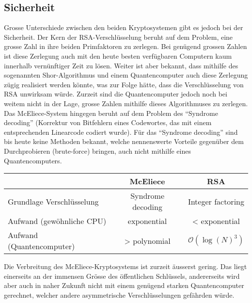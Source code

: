 \subsection{Sicherheit}
Grosse Unterschiede zwischen den beiden Kryptosystemen gibt es jedoch bei der Sicherheit.
Der Kern der RSA-Verschlüsselung beruht auf dem Problem, eine grosse Zahl in ihre beiden Primfaktoren zu zerlegen.
Bei genügend grossen Zahlen ist diese Zerlegung auch mit den heute besten verfügbaren Computern kaum innerhalb vernünftiger Zeit zu lösen.
Weiter ist aber bekannt,
dass mithilfe des sogenannten Shor-Algorithmus \cite{mceliece:shor} und einem Quantencomputer auch diese Zerlegung zügig realisiert werden könnte,
was zur Folge hätte, dass die Verschlüsselung von RSA unwirksam würde.
Zurzeit sind die Quantencomputer jedoch noch bei weitem nicht in der Lage, grosse Zahlen mithilfe dieses Algorithmuses zu zerlegen.
Das McEliece-System hingegen beruht auf dem Problem des ``Syndrome decoding'' (Korrektur von Bitfehlern eines Codewortes, das mit einem entsprechenden Linearcode codiert wurde).
Für das ``Syndrome decoding'' sind bis heute keine Methoden bekannt,
welche nennenswerte Vorteile gegenüber dem Durchprobieren (brute-force) bringen,
auch nicht mithilfe eines Quantencomputers.
\begin{center}
\begin{tabular}{l|c|c}
                              &McEliece          &RSA              \\
\hline
    Grundlage Verschlüsselung &Syndrome decoding &Integer factoring\\
    Aufwand (gewöhnliche CPU) &exponential       &< exponential    \\
    Aufwand (Quantencomputer) &> polynomial      &$\mathcal{O}(\log(N)^3)$
\end{tabular}
\end{center}
Die Verbreitung des McEliece-Kryptosystems ist zurzeit äusserst gering.
Das liegt einerseits an der immensen Grösse des öffentlichen Schlüssels,
andererseits wird aber auch in naher Zukunft nicht mit einem genügend starken Quantencomputer gerechnet,
welcher andere asymmetrische Verschlüsselungen gefährden würde.
